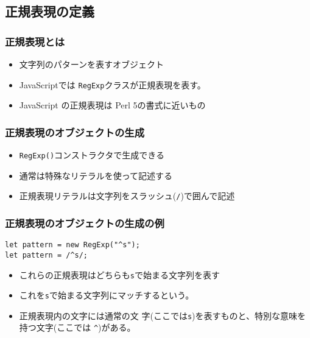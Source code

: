  \subsection{正規表現の定義}
\begin{frame}
 \frametitle{正規表現とは}
\begin{itemize}
 \item 文字列のパターンを表すオブジェクト
 \item JavaScriptでは
\texttt{RegExp}クラスが正規表現を表す。
 \item JavaScript の正規表現は Perl 5の書式に近いもの
\end{itemize}
\end{frame}
\begin{frame}
 \frametitle{正規表現のオブジェクトの生成}
\begin{itemize}
 \item \texttt{RegExp()}コンストラクタで生成できる
 \item 通常は特殊なリテラルを使って記述する
 \item 正規表現リテラルは文字列をスラッシュ(\texttt{/})で囲んで記述
\end{itemize}
\end{frame}
\begin{frame}[containsverbatim]
 \frametitle{正規表現のオブジェクトの生成の例}
\begin{Verbatim}
let pattern = new RegExp("^s");
let pattern = /^s/;
\end{Verbatim}
\begin{itemize}
 \item これらの正規表現はどちらも\texttt{s}で始まる文字列を表す
 \item これを\texttt{s}で始まる文字列にマッチするという。
 \item 正規表現内の文字には通常の文
字(ここでは\texttt{s})を表すものと、特別な意味を持つ文字(ここでは
\Verb+^+)がある。
\end{itemize}
\end{frame}
